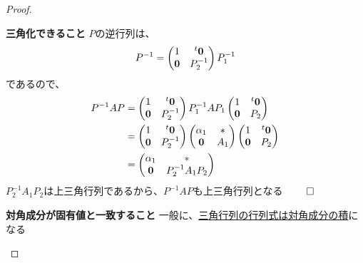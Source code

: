 \documentclass[../../../topic_linear-algebra]{subfiles}
\begin{document}
\begin{proof}
\begin{subpattern}{\bfseries 三角化できること}
    $P$の逆行列は、
    \begin{equation*}
      P^{-1} = \begin{pmatrix}
        1       & {}^t\vb*{0} \\
        \vb*{0} & P_2^{-1}
      \end{pmatrix} P_1^{-1}
    \end{equation*}
    であるので、
    \begin{align*}
      P^{-1}AP & = \begin{pmatrix}
                     1       & {}^t\vb*{0} \\
                     \vb*{0} & P_2^{-1}
                   \end{pmatrix} P_1^{-1} A P_1 \begin{pmatrix}
                                                  1       & {}^t\vb*{0} \\
                                                  \vb*{0} & P_2
                                                \end{pmatrix} \\
               & = \begin{pmatrix}
                     1       & {}^t\vb*{0} \\
                     \vb*{0} & P_2^{-1}
                   \end{pmatrix} \begin{pmatrix}
                                   \alpha_1 & *   \\
                                   \vb*{0}  & A_1
                                 \end{pmatrix}\begin{pmatrix}
                                                1       & {}^t\vb*{0} \\
                                                \vb*{0} & P_2
                                              \end{pmatrix}   \\
               & = \begin{pmatrix}
                     \alpha_1 & *              \\
                     \vb*{0}  & P_2^{-1}A_1P_2
                   \end{pmatrix}
    \end{align*}
    $P_2^{-1}A_1P_2$は上三角行列であるから、$P^{-1}AP$も上三角行列となる $\qed$
  \end{subpattern}

  \begin{subpattern}{\bfseries 対角成分が固有値と一致すること}
    一般に、\hyperref[thm:det-of-triangular-matrix]{三角行列の行列式は対角成分の積}になる


\end{subpattern}
\end{proof}
\end{document}
